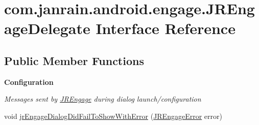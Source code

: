 \hypertarget{interfacecom_1_1janrain_1_1android_1_1engage_1_1_j_r_engage_delegate}{
\section{com.janrain.android.engage.JREngageDelegate Interface Reference}
\label{interfacecom_1_1janrain_1_1android_1_1engage_1_1_j_r_engage_delegate}
}
\subsection*{Public Member Functions}
\begin{Indent}{\bf Configuration}\par
{\em \label{_amgrp254f642527b45bc260048e30704edb39}
 Messages sent by \hyperlink{classcom_1_1janrain_1_1android_1_1engage_1_1_j_r_engage}{JREngage} during dialog launch/configuration }\begin{DoxyCompactItemize}
\item 
void \hyperlink{interfacecom_1_1janrain_1_1android_1_1engage_1_1_j_r_engage_delegate_ae5264ff26bf62b438bd515b89992a791}{jrEngageDialogDidFailToShowWithError} (\hyperlink{classcom_1_1janrain_1_1android_1_1engage_1_1_j_r_engage_error}{JREngageError} error)
\end{DoxyCompactItemize}
\end{Indent}
